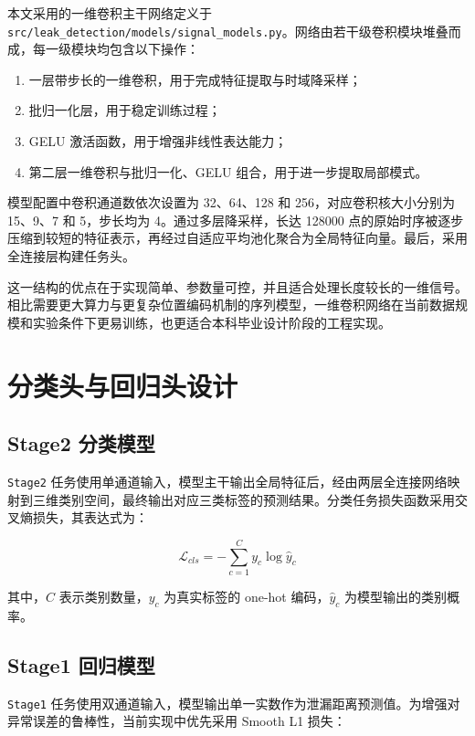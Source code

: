 本文采用的一维卷积主干网络定义于 \texttt{src/leak\_detection/models/signal\_models.py}。网络由若干级卷积模块堆叠而成，每一级模块均包含以下操作：

\begin{enumerate}
  \item 一层带步长的一维卷积，用于完成特征提取与时域降采样；
  \item 批归一化层，用于稳定训练过程；
  \item GELU 激活函数，用于增强非线性表达能力；
  \item 第二层一维卷积与批归一化、GELU 组合，用于进一步提取局部模式。
\end{enumerate}

模型配置中卷积通道数依次设置为 32、64、128 和 256，对应卷积核大小分别为 15、9、7 和 5，步长均为 4。通过多层降采样，长达 128000 点的原始时序被逐步压缩到较短的特征表示，再经过自适应平均池化聚合为全局特征向量。最后，采用全连接层构建任务头。

这一结构的优点在于实现简单、参数量可控，并且适合处理长度较长的一维信号。相比需要更大算力与更复杂位置编码机制的序列模型，一维卷积网络在当前数据规模和实验条件下更易训练，也更适合本科毕业设计阶段的工程实现。

\section{分类头与回归头设计}

\subsection{Stage2 分类模型}

\texttt{Stage2} 任务使用单通道输入，模型主干输出全局特征后，经由两层全连接网络映射到三维类别空间，最终输出对应三类标签的预测结果。分类任务损失函数采用交叉熵损失，其表达式为：

\begin{equation}
\mathcal{L}_{cls} = - \sum_{c=1}^{C} y_c \log \hat{y}_c
\end{equation}

其中，$C$ 表示类别数量，$y_c$ 为真实标签的 one-hot 编码，$\hat{y}_c$ 为模型输出的类别概率。

\subsection{Stage1 回归模型}

\texttt{Stage1} 任务使用双通道输入，模型输出单一实数作为泄漏距离预测值。为增强对异常误差的鲁棒性，当前实现中优先采用 Smooth L1 损失：

